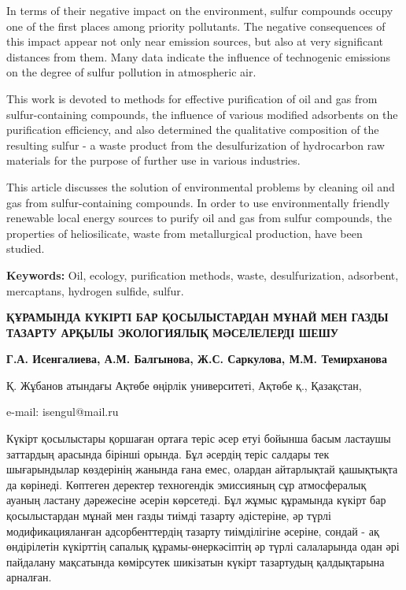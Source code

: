 In terms of their negative impact on the environment, sulfur compounds
occupy one of the first places among priority pollutants. The negative
consequences of this impact appear not only near emission sources, but
also at very significant distances from them. Many data indicate the
influence of technogenic emissions on the degree of sulfur pollution in
atmospheric air.

This work is devoted to methods for effective purification of oil and
gas from sulfur-containing compounds, the influence of various modified
adsorbents on the purification efficiency, and also determined the
qualitative composition of the resulting sulfur - a waste product from
the desulfurization of hydrocarbon raw materials for the purpose of
further use in various industries.

This article discusses the solution of environmental problems by
cleaning oil and gas from sulfur-containing compounds. In order to use
environmentally friendly renewable local energy sources to purify oil
and gas from sulfur compounds, the properties of heliosilicate, waste
from metallurgical production, have been studied.

{\bfseries Keywords:} Oil, ecology, purification methods, waste,
desulfurization, adsorbent, mercaptans, hydrogen sulfide, sulfur.

\begin{center}
{\large\bfseries ҚҰРАМЫНДА КҮКІРТІ БАР ҚОСЫЛЫСТАРДАН МҰНАЙ МЕН ГАЗДЫ ТАЗАРТУ АРҚЫЛЫ ЭКОЛОГИЯЛЫҚ МӘСЕЛЕЛЕРДІ ШЕШУ}

{\bfseries Г.А. Исенгалиева\envelope, А.М. Балгынова, Ж.С. Саркулова, М.М. Темирханова}

Қ. Жұбанов атындағы Ақтөбе өңірлік университеті, Ақтөбе қ., Қазақстан,

e-mail: isengul@mail.ru
\end{center}

Күкірт қосылыстары қоршаған ортаға теріс әсер етуі бойынша басым
ластаушы заттардың арасында бірінші орында. Бұл әсердің теріс салдары
тек шығарындылар көздерінің жанында ғана емес, олардан айтарлықтай
қашықтықта да көрінеді. Көптеген деректер техногендік эмиссияның сұр
атмосфералық ауаның ластану дәрежесіне әсерін көрсетеді. Бұл жұмыс
құрамында күкірт бар қосылыстардан мұнай мен газды тиімді тазарту
әдістеріне, әр түрлі модификацияланған адсорбенттердің тазарту
тиімділігіне әсеріне, сондай - ақ өндірілетін күкірттің сапалық
құрамы-өнеркәсіптің әр түрлі салаларында одан әрі пайдалану мақсатында
көмірсутек шикізатын күкірт тазартудың қалдықтарына арналған.

